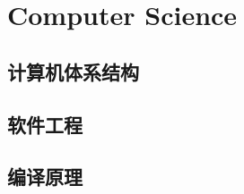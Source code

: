 \documentclass[main.tex]{subfiles}
\begin{document}
\chapter{Computer Science}


\section{计算机体系结构}

\section{软件工程}



\section{编译原理}
\end{document}
